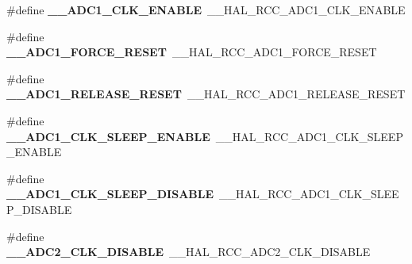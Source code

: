 \begin{DoxyCompactItemize}
\item 
\#define {\bfseries \+\_\+\+\_\+\+A\+D\+C1\+\_\+\+C\+L\+K\+\_\+\+E\+N\+A\+B\+LE}~\+\_\+\+\_\+\+H\+A\+L\+\_\+\+R\+C\+C\+\_\+\+A\+D\+C1\+\_\+\+C\+L\+K\+\_\+\+E\+N\+A\+B\+LE\hypertarget{group___h_a_l___r_c_c___aliased_ga9a9d5243d8f3d6747cfbb026fdf2e0b7}{}\label{group___h_a_l___r_c_c___aliased_ga9a9d5243d8f3d6747cfbb026fdf2e0b7}

\item 
\#define {\bfseries \+\_\+\+\_\+\+A\+D\+C1\+\_\+\+F\+O\+R\+C\+E\+\_\+\+R\+E\+S\+ET}~\+\_\+\+\_\+\+H\+A\+L\+\_\+\+R\+C\+C\+\_\+\+A\+D\+C1\+\_\+\+F\+O\+R\+C\+E\+\_\+\+R\+E\+S\+ET\hypertarget{group___h_a_l___r_c_c___aliased_ga74c96fb6dcb3e5ac23637040874f742a}{}\label{group___h_a_l___r_c_c___aliased_ga74c96fb6dcb3e5ac23637040874f742a}

\item 
\#define {\bfseries \+\_\+\+\_\+\+A\+D\+C1\+\_\+\+R\+E\+L\+E\+A\+S\+E\+\_\+\+R\+E\+S\+ET}~\+\_\+\+\_\+\+H\+A\+L\+\_\+\+R\+C\+C\+\_\+\+A\+D\+C1\+\_\+\+R\+E\+L\+E\+A\+S\+E\+\_\+\+R\+E\+S\+ET\hypertarget{group___h_a_l___r_c_c___aliased_ga58dc5da806adc545da8e62b986f6c4f4}{}\label{group___h_a_l___r_c_c___aliased_ga58dc5da806adc545da8e62b986f6c4f4}

\item 
\#define {\bfseries \+\_\+\+\_\+\+A\+D\+C1\+\_\+\+C\+L\+K\+\_\+\+S\+L\+E\+E\+P\+\_\+\+E\+N\+A\+B\+LE}~\+\_\+\+\_\+\+H\+A\+L\+\_\+\+R\+C\+C\+\_\+\+A\+D\+C1\+\_\+\+C\+L\+K\+\_\+\+S\+L\+E\+E\+P\+\_\+\+E\+N\+A\+B\+LE\hypertarget{group___h_a_l___r_c_c___aliased_ga9ce0348811aae0a082ef462e050bdbfa}{}\label{group___h_a_l___r_c_c___aliased_ga9ce0348811aae0a082ef462e050bdbfa}

\item 
\#define {\bfseries \+\_\+\+\_\+\+A\+D\+C1\+\_\+\+C\+L\+K\+\_\+\+S\+L\+E\+E\+P\+\_\+\+D\+I\+S\+A\+B\+LE}~\+\_\+\+\_\+\+H\+A\+L\+\_\+\+R\+C\+C\+\_\+\+A\+D\+C1\+\_\+\+C\+L\+K\+\_\+\+S\+L\+E\+E\+P\+\_\+\+D\+I\+S\+A\+B\+LE\hypertarget{group___h_a_l___r_c_c___aliased_gab6f5f7285730b9e581578c27eb407246}{}\label{group___h_a_l___r_c_c___aliased_gab6f5f7285730b9e581578c27eb407246}

\item 
\#define {\bfseries \+\_\+\+\_\+\+A\+D\+C2\+\_\+\+C\+L\+K\+\_\+\+D\+I\+S\+A\+B\+LE}~\+\_\+\+\_\+\+H\+A\+L\+\_\+\+R\+C\+C\+\_\+\+A\+D\+C2\+\_\+\+C\+L\+K\+\_\+\+D\+I\+S\+A\+B\+LE\hypertarget{group___h_a_l___r_c_c___aliased_gae27221f87c3db8c7e520cd404e530a49}{}\label{group___h_a_l___r_c_c___aliased_gae27221f87c3db8c7e520cd404e530a49}


\end{DoxyCompactItemize}
